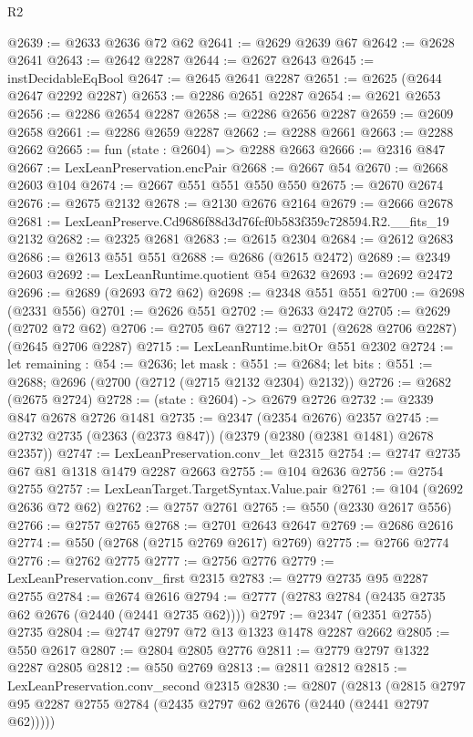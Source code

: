 \begin{lexlean}{R2}
\begin{coremodule}
@2639 := @2633 @2636 @72 @62
@2641 := @2629 @2639 @67
@2642 := @2628 @2641
@2643 := @2642 @2287
@2644 := @2627 @2643
@2645 := instDecidableEqBool
@2647 := @2645 @2641 @2287
@2651 := @2625 (@2644 @2647 @2292 @2287)
@2653 := @2286 @2651 @2287
@2654 := @2621 @2653
@2656 := @2286 @2654 @2287
@2658 := @2286 @2656 @2287
@2659 := @2609 @2658
@2661 := @2286 @2659 @2287
@2662 := @2288 @2661
@2663 := @2288 @2662
@2665 := fun (state : @2604) => @2288 @2663
@2666 := @2316 @847
@2667 := LexLeanPreservation.encPair
@2668 := @2667 @54
@2670 := @2668 @2603 @104
@2674 := @2667 @551 @551 @550 @550
@2675 := @2670 @2674
@2676 := @2675 @2132
@2678 := @2130 @2676 @2164
@2679 := @2666 @2678
@2681 := LexLeanPreserve.Cd9686f88d3d76fcf0b583f359c728594.R2.__fits_19 @2132
@2682 := @2325 @2681
@2683 := @2615 @2304
@2684 := @2612 @2683
@2686 := @2613 @551 @551
@2688 := @2686 (@2615 @2472)
@2689 := @2349 @2603
@2692 := LexLeanRuntime.quotient @54 @2632
@2693 := @2692 @2472
@2696 := @2689 (@2693 @72 @62)
@2698 := @2348 @551 @551
@2700 := @2698 (@2331 @556)
@2701 := @2626 @551
@2702 := @2633 @2472
@2705 := @2629 (@2702 @72 @62)
@2706 := @2705 @67
@2712 := @2701 (@2628 @2706 @2287) (@2645 @2706 @2287)
@2715 := LexLeanRuntime.bitOr @551 @2302
@2724 := let remaining : @54 := @2636;
  let mask : @551 := @2684;
  let bits : @551 := @2688; @2696 (@2700 (@2712 (@2715 @2132 @2304) @2132))
@2726 := @2682 (@2675 @2724)
@2728 := (state : @2604) -> @2679 @2726
@2732 := @2339 @847 @2678 @2726 @1481
@2735 := @2347 (@2354 @2676) @2357
@2745 := @2732 @2735 (@2363 (@2373 @847)) (@2379 (@2380 (@2381 @1481) @2678 @2357))
@2747 := LexLeanPreservation.conv_let @2315
@2754 := @2747 @2735 @67 @81 @1318 @1479 @2287 @2663
@2755 := @104 @2636
@2756 := @2754 @2755
@2757 := LexLeanTarget.TargetSyntax.Value.pair
@2761 := @104 (@2692 @2636 @72 @62)
@2762 := @2757 @2761
@2765 := @550 (@2330 @2617 @556)
@2766 := @2757 @2765
@2768 := @2701 @2643 @2647
@2769 := @2686 @2616
@2774 := @550 (@2768 (@2715 @2769 @2617) @2769)
@2775 := @2766 @2774
@2776 := @2762 @2775
@2777 := @2756 @2776
@2779 := LexLeanPreservation.conv_first @2315
@2783 := @2779 @2735 @95 @2287 @2755
@2784 := @2674 @2616
@2794 := @2777 (@2783 @2784 (@2435 @2735 @62 @2676 (@2440 (@2441 @2735 @62))))
@2797 := @2347 (@2351 @2755) @2735
@2804 := @2747 @2797 @72 @13 @1323 @1478 @2287 @2662
@2805 := @550 @2617
@2807 := @2804 @2805 @2776
@2811 := @2779 @2797 @1322 @2287 @2805
@2812 := @550 @2769
@2813 := @2811 @2812
@2815 := LexLeanPreservation.conv_second @2315
@2830 := @2807
    (@2813 (@2815 @2797 @95 @2287 @2755 @2784 (@2435 @2797 @62 @2676 (@2440 (@2441 @2797 @62)))))

\end{coremodule}
\end{lexlean}
